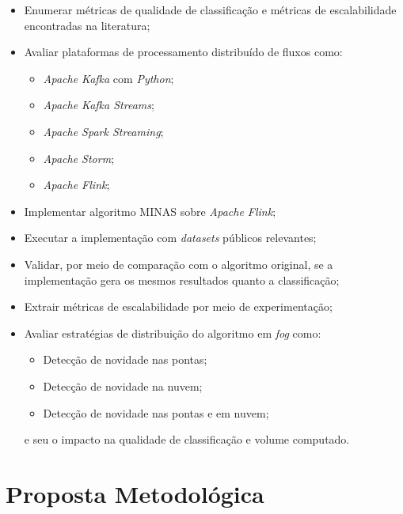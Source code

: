 \begin{itemize}
    \item Enumerar métricas de qualidade de classificação e métricas de
    escalabilidade encontradas na literatura;
    \item Avaliar plataformas de processamento distribuído de fluxos como:
    \begin{itemize}
        \item \emph{Apache Kafka} com \emph{Python};
        \item \emph{Apache Kafka Streams};
        \item \emph{Apache Spark Streaming};
        \item \emph{Apache Storm};
        \item \emph{Apache Flink};
    \end{itemize}
    \item Implementar algoritmo MINAS sobre \emph{Apache Flink};
    \item Executar a implementação com \emph{datasets} públicos relevantes;
    \item Validar, por meio de comparação com o algoritmo original, se a
    implementação gera os mesmos resultados quanto a classificação;
    \item Extrair métricas de escalabilidade por meio de experimentação;
    \item Avaliar estratégias de distribuição do algoritmo em \emph{fog} como:
    \begin{itemize}
        \item Detecção de novidade nas pontas;
        \item Detecção de novidade na nuvem;
        \item Detecção de novidade nas pontas e em nuvem;
    \end{itemize}
    e seu o impacto na qualidade de classificação e volume computado.
\end{itemize}


\section{Proposta Metodológica}


